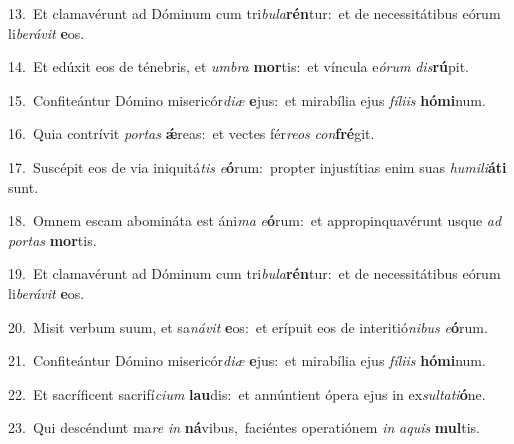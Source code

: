 {\numbfont\textcolor{\numbcolor}{13.}}~Et clamavérunt ad Dóminum cum tri\-\textit{bu}\-\textit{la}\textbf{rén}tur:~\star et de necessitátibus eórum li\-\textit{be}\-\textit{rá}\textit{vit} \textbf{e}\-os.\par
{\numbfont\textcolor{\numbcolor}{14.}}~Et edúxit eos de ténebris, et \textit{um}\-\textit{bra} \textbf{mor}\-tis:~\star et víncula e\-\textit{ó}\-\textit{rum} \textit{dis}\-\textbf{rú}pit.\par
{\numbfont\textcolor{\numbcolor}{15.}}~Confiteántur Dómino misericór\-\textit{di}\-\textit{æ} \textbf{e}\-jus:~\star et mirabília ejus \textit{fí}\-\textit{li}\textit{is} \textbf{hó}\-\textbf{mi}num.\par
{\numbfont\textcolor{\numbcolor}{16.}}~Quia contrívit \textit{por}\-\textit{tas} \textbf{ǽ}\-reas:~\star et vectes fér\-\textit{re}\-\textit{os} \textit{con}\-\textbf{fré}git.\par
{\numbfont\textcolor{\numbcolor}{17.}}~Suscépit eos de via iniquitá\textit{tis} \textit{e}\-\textbf{ó}rum:~\star propter injustítias enim suas \textit{hu}\-\textit{mi}\textit{li}\textbf{á}\textbf{ti} sunt.\par
{\numbfont\textcolor{\numbcolor}{18.}}~Omnem escam abomináta est áni\textit{ma} \textit{e}\-\textbf{ó}rum:~\star et appropinquavérunt usque \textit{ad} \textit{por}\-\textit{tas} \textbf{mor}\-tis.\par
{\numbfont\textcolor{\numbcolor}{19.}}~Et clamavérunt ad Dóminum cum tri\-\textit{bu}\-\textit{la}\textbf{rén}tur:~\star et de necessitátibus eórum li\-\textit{be}\-\textit{rá}\textit{vit} \textbf{e}\-os.\par
{\numbfont\textcolor{\numbcolor}{20.}}~Misit verbum suum, et sa\-\textit{ná}\-\textit{vit} \textbf{e}\-os:~\star et erípuit eos de interitió\-\textit{ni}\-\textit{bus} \textit{e}\-\textbf{ó}rum.\par
{\numbfont\textcolor{\numbcolor}{21.}}~Confiteántur Dómino misericór\-\textit{di}\-\textit{æ} \textbf{e}\-jus:~\star et mirabília ejus \textit{fí}\-\textit{li}\textit{is} \textbf{hó}\-\textbf{mi}num.\par
{\numbfont\textcolor{\numbcolor}{22.}}~Et sacríficent sacrifí\-\textit{ci}\-\textit{um} \textbf{lau}\-dis:~\star et annúntient ópera ejus in ex\-\textit{sul}\-\textit{ta}\textit{ti}\textbf{ó}ne.\par
{\numbfont\textcolor{\numbcolor}{23.}}~Qui descéndunt ma\textit{re} \textit{in} \textbf{ná}\-vibus,~\star faciéntes operatiónem \textit{in} \textit{a}\-\textit{quis} \textbf{mul}\-tis.\par
